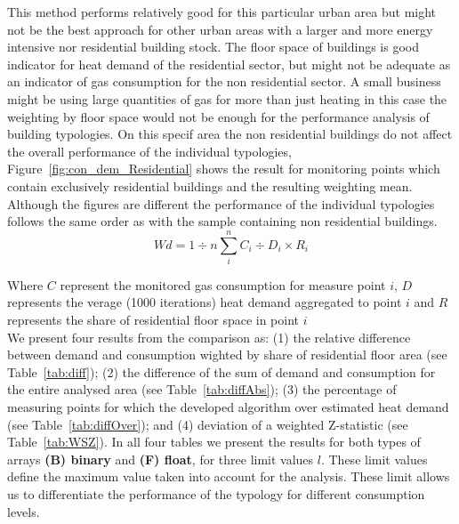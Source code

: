 \documentclass[authoryear,preprint,review,12pt]{elsarticle}
\begin{document}
\begin{linenumbers}
This method performs relatively good for this particular urban area but might
not be the best approach for other urban areas with a larger and more energy
intensive nor residential building stock. The floor space of buildings is good
indicator for heat demand of the residential sector, but might not be adequate
as an indicator of gas consumption for the non residential sector. A small
business might be using large quantities of gas for more than just heating in
this case the weighting by floor space would not be enough for the performance
analysis of building typologies. On this specif area the non residential
buildings do not affect the overall performance of the individual typologies,
Figure~\ref{fig:con_dem_Residential} shows the result for monitoring points
which contain exclusively residential buildings and the resulting weighting
mean. Although the figures are different the performance of the individual
typologies follows the same order as with the sample containing non residential
buildings.\\ 

\begin{equation} \label{eq:diff}
Wd = 1 \div n \sum_i^n C_i \div D_i \times R_i
\end{equation} 

Where
$C$ represent the  monitored gas consumption for measure point $i$, 
$D$ represents the verage (1000 iterations) heat demand aggregated to point
$i$ and $R$ represents the share of residential floor space in point
$i$\\

We present four results from the comparison as: (1) the relative
difference between demand and consumption wighted by share of residential floor
area (see Table~\ref{tab:diff}); (2) the difference of the sum of demand and
consumption for the entire analysed area (see Table~\ref{tab:diffAbs}); (3) the
percentage of measuring points for which the developed algorithm over estimated
heat demand (see Table~\ref{tab:diffOver}); and (4) deviation of a weighted
Z-statistic (see Table~\ref{tab:WSZ}).  In all four tables we present the
results for both types of arrays \textbf{(B) binary} and \textbf{(F) float},
for three limit values $l$. These limit values define the maximum value taken
into account for the analysis. These limit allows us to differentiate the
performance of the typology for different consumption levels.\\


\end{linenumbers}
\end{document}

